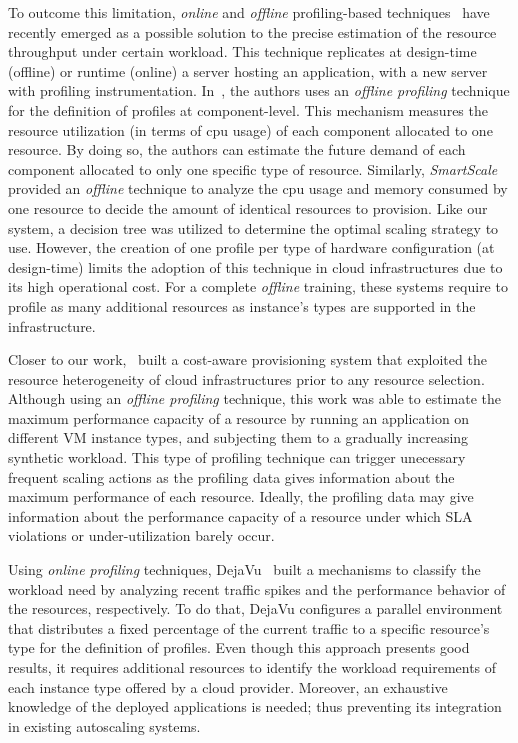  
To outcome this limitation, \emph{online} and \emph{offline} profiling-based techniques~\cite{kaviani_profiling-as--service:_2011} have recently emerged as a possible solution to the precise estimation of the resource throughput under certain workload. This technique replicates at design-time (offline) or runtime (online) a server hosting an application, with a new server with profiling instrumentation. In~\cite{roy_2011}, the authors uses an \emph{offline profiling} technique for the definition of profiles at component-level. This mechanism measures the resource utilization (in terms of cpu usage) of each component allocated to one resource. By doing so, the authors can estimate the future demand of each component allocated to only one specific type of resource. Similarly, \emph{SmartScale}~\cite{smartscale_2012} provided an \emph{offline} technique to analyze the cpu usage and memory consumed by one resource to decide the amount of identical resources to provision. Like our system, a decision tree was utilized to determine the optimal scaling strategy to use. However, the creation of one profile per type of hardware configuration (at design-time) limits the adoption of this technique in cloud infrastructures due to its high operational cost. For a complete \emph{offline} training, these systems require to profile as many additional resources as instance's types are supported in the infrastructure. 

Closer to our work,~\cite{sharma_cost-aware_2011} built a cost-aware provisioning system that exploited the resource heterogeneity of cloud infrastructures prior to any resource selection. Although using an \emph{offline profiling} technique, this work was able to estimate the maximum performance capacity of a resource by running an application on different VM instance types, and subjecting them to a gradually increasing synthetic workload. This type of profiling technique can trigger unecessary frequent scaling actions as the profiling data gives information about the maximum performance of each resource. Ideally, the profiling data may give information about the performance capacity of a resource under which SLA violations or under-utilization barely occur.

Using \emph{online profiling} techniques, DejaVu~\cite{dejavu2012}  built a mechanisms to classify the workload need by analyzing recent traffic spikes and the performance behavior of the resources, respectively. To do that, DejaVu configures a parallel environment that distributes a fixed percentage of the current traffic to a specific resource's type for the definition of profiles. Even though this approach presents good results, it requires additional resources to identify the workload requirements of each instance type offered by a cloud provider. Moreover, an exhaustive knowledge of the deployed applications is needed; thus preventing its integration in existing autoscaling systems.  


